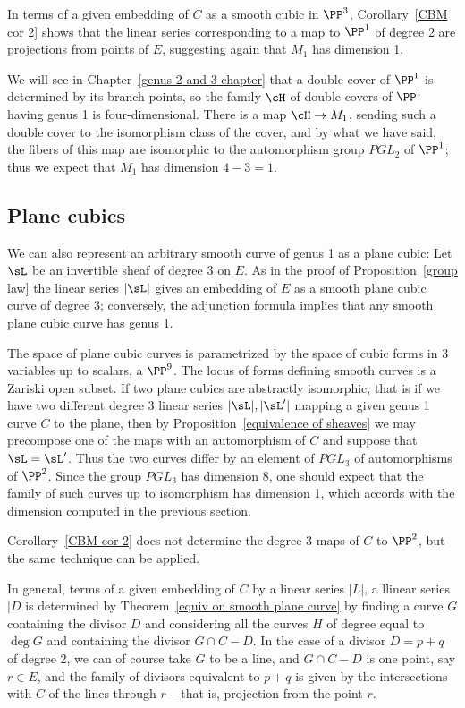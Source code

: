 In terms of a given embedding of $C$ as a smooth cubic in $\PP^{3}$, Corollary~\ref{CBM cor 2}
shows that the linear series corresponding to a map to $\PP^{1}$ of degree 2 are 
projections from points of $E$, suggesting again that $M_{1}$ has dimension 1.

We will see in Chapter~\ref{genus 2 and 3 chapter} that a double cover of $\PP^1$ is determined by  its branch points, so the family $\cH$ of double covers of $\PP^1$ having genus 1 is four-dimensional. There is a map $\cH \to M_1$, sending such a double cover to the isomorphism class of the cover, and by what we have said, the fibers of this map are isomorphic to the automorphism group $PGL_2$ of $\PP^1$; thus we expect that $M_1$ has dimension $4-3=1$.

\subsection{Plane cubics}

We can also represent an arbitrary smooth curve of genus 1 as a plane cubic:
Let $\sL$ be an invertible sheaf of degree 3 on $E$. As in the proof of Proposition~\ref{group law} the linear series $|\sL|$ gives an embedding of $E$ as a smooth plane cubic curve of degree 3; conversely, the adjunction formula implies that any smooth plane cubic curve has genus 1. 

The space of plane cubic curves is parametrized by the space of cubic forms in 3 variables up to 
scalars, a  $\PP^9$. The locus of forms defining smooth curves is a Zariski open subset. If two plane cubics are abstractly
isomorphic, that is if we have two different degree 3 linear series $|\sL|, |\sL'|$ mapping a given genus 1 curve $C$ to the plane, then by
Proposition~\ref{equivalence of sheaves} we may  precompose one of the maps with an automorphism of $C$
and suppose that $\sL = \sL'$. Thus the two curves differ by an element of $PGL_3$ of automorphisms of $\PP^2$. Since the group $PGL_3$ has dimension 8, one should expect that the family of such curves up to isomorphism has dimension 1, which accords with the dimension computed in the previous section.

Corollary~\ref{CBM cor 2} does not determine the degree 3 maps of $C$ to $\PP^{2}$, but the same technique can be applied.

In general,  terms of a given embedding of $C$ by a linear series $|L|$, a llinear series
$|D$ is determined by Theorem~\ref{equiv on smooth plane curve} by finding a curve $G$ containing the divisor $D$ and considering all the curves $H$ of degree equal to $\deg G$
and containing the divisor $G\cap C - D$. In the case of a divisor $D = p+q$ of degree 2,
we can of course take $G$ to be a line, and $G\cap C - D$ is one point, say $r\in E$, 
and the family of divisors equivalent to $p+q$ is given by the intersections with $C$
of the lines through $r$ -- that is, projection from the point $r$.





